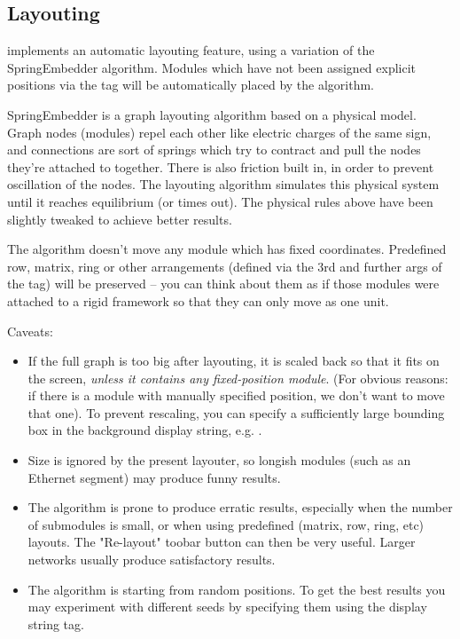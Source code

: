 
\subsection{Layouting}
\label{sec:ch-graphics:layouting}

{\opp} implements an automatic layouting feature, using
a variation of the SpringEmbedder algorithm. Modules which have
not been assigned explicit positions via the  tag will be
automatically placed by the algorithm.

SpringEmbedder is a graph layouting algorithm based on a physical model.
Graph nodes (modules) repel each other like electric charges
of the same sign, and connections are sort of springs which try
to contract and pull the nodes they're attached to together. There is also friction
built in, in order to prevent oscillation of the nodes. The layouting algorithm
simulates this physical system until it reaches equilibrium
(or times out). The physical rules above have been slightly tweaked
to achieve better results.

The algorithm doesn't move any module which has fixed coordinates.
Predefined row, matrix, ring or other arrangements (defined
via the 3rd and further args of the  tag) will be preserved --
you can think about them as if those modules were attached
to a rigid framework so that they can only move as one unit.

Caveats:

\begin{itemize}
  \item If the full graph is too big after layouting, it is scaled
    back so that it fits on the screen, \textit{unless it contains
    any fixed-position module}. (For obvious reasons: if there is a module
    with manually specified position, we don't want to move that one).
    To prevent rescaling, you can specify a sufficiently large bounding
    box in the background display string, e.g. .
  \item Size is ignored by the present layouter, so longish modules
    (such as an Ethernet segment) may produce funny results.
  \item The algorithm is prone to produce erratic results, especially
    when the number of submodules is small, or when using predefined
    (matrix, row, ring, etc) layouts. The "Re-layout" toobar button
    can then be very useful. Larger networks usually produce
    satisfactory results.
  \item The algorithm is starting from random positions.
     To get the best results you may experiment with
    different seeds by specifying them using the 
    display string tag.
\end{itemize}

